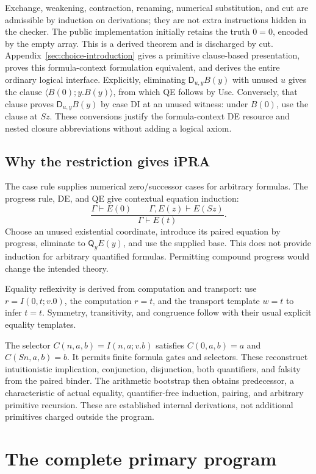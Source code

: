 \documentclass[11pt,letterpaper]{article}
\theoremstyle{definition}\newtheorem{definition}[theorem]{Definition}
\theoremstyle{remark}\newtheorem{remark}[theorem]{Remark}
\newcommand{\D}{\mathsf D}
\newcommand{\Q}{\mathsf Q}
\begin{document}
Exchange, weakening, contraction, renaming, numerical substitution, and cut
are admissible by induction on derivations; they are not extra instructions
hidden in the checker. The public implementation initially retains the truth
$0=0$, encoded by the empty array. This is a derived theorem and is discharged
by cut. Appendix~\ref{sec:choice-introduction} gives a primitive clause-based
presentation, proves this formula-context formulation equivalent, and derives
the entire ordinary logical interface. Explicitly, eliminating
$\D_{u,y}B(y)$ with unused $u$ gives the clause
$\langle B(0);y.B(y)\rangle$, from which QE follows by Use. Conversely,
that clause proves $\D_{u,y}B(y)$ by case DI at an unused witness: under
$B(0)$, use the clause at $Sz$. These conversions justify the formula-context
DE resource and nested closure abbreviations without adding a logical axiom.

\subsection{Why the restriction gives iPRA}

The case rule supplies numerical zero/successor cases for arbitrary formulas.
The progress rule, DE, and QE give contextual equation induction:
\[
 \frac{\Gamma\vdash E(0)\qquad\Gamma,E(z)\vdash E(Sz)}
      {\Gamma\vdash E(t)}.
\]
Choose an unused existential coordinate, introduce its paired equation by
progress, eliminate to $\Q_yE(y)$, and use the supplied base. This does not
provide induction for arbitrary quantified formulas. Permitting compound
progress would change the intended theory.

Equality reflexivity is derived from computation and transport: use
$r=I(0,t;v.0)$, the computation $r=t$, and the transport template $w=t$
to infer $t=t$. Symmetry, transitivity, and congruence follow with their
usual explicit equality templates.

The selector $C(n,a,b)=I(n,a;v.b)$ satisfies $C(0,a,b)=a$ and
$C(Sn,a,b)=b$. It permits finite formula gates and selectors. These reconstruct
intuitionistic implication, conjunction, disjunction, both quantifiers, and
falsity from the paired binder. The arithmetic bootstrap then obtains
predecessor, a characteristic of actual equality, quantifier-free induction,
pairing, and arbitrary primitive recursion. These are established internal
derivations, not additional primitives charged outside the program.

\section{The complete primary program}
\end{document}
